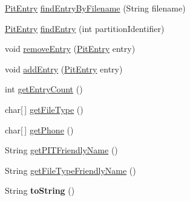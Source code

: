 \begin{DoxyCompactItemize}
\item 
\hyperlink{class_c_a_s_u_a_l_1_1archiving_1_1libpit_1_1_pit_entry}{Pit\-Entry} \hyperlink{class_c_a_s_u_a_l_1_1archiving_1_1libpit_1_1_pit_data_ac07383ca9cf4750eb9de5cdf1690121f}{find\-Entry\-By\-Filename} (String filename)
\item 
\hyperlink{class_c_a_s_u_a_l_1_1archiving_1_1libpit_1_1_pit_entry}{Pit\-Entry} \hyperlink{class_c_a_s_u_a_l_1_1archiving_1_1libpit_1_1_pit_data_a5d139fcadf351b81b00298f1578a9cc5}{find\-Entry} (int partition\-Identifier)
\item 
void \hyperlink{class_c_a_s_u_a_l_1_1archiving_1_1libpit_1_1_pit_data_a2102b1e03aa2de4c6d80f8e43576b06d}{remove\-Entry} (\hyperlink{class_c_a_s_u_a_l_1_1archiving_1_1libpit_1_1_pit_entry}{Pit\-Entry} entry)
\item 
void \hyperlink{class_c_a_s_u_a_l_1_1archiving_1_1libpit_1_1_pit_data_aea22df6b38acde79df88ea8255e60ec2}{add\-Entry} (\hyperlink{class_c_a_s_u_a_l_1_1archiving_1_1libpit_1_1_pit_entry}{Pit\-Entry} entry)
\item 
int \hyperlink{class_c_a_s_u_a_l_1_1archiving_1_1libpit_1_1_pit_data_a64a120bc22b1061952e01188a30f7eeb}{get\-Entry\-Count} ()
\item 
char\mbox{[}$\,$\mbox{]} \hyperlink{class_c_a_s_u_a_l_1_1archiving_1_1libpit_1_1_pit_data_a07f12e00c2077eebc28fc251f87752f8}{get\-File\-Type} ()
\item 
char\mbox{[}$\,$\mbox{]} \hyperlink{class_c_a_s_u_a_l_1_1archiving_1_1libpit_1_1_pit_data_a1cdc24d3cdfdd1e716a856fb3cb2c22d}{get\-Phone} ()
\item 
String \hyperlink{class_c_a_s_u_a_l_1_1archiving_1_1libpit_1_1_pit_data_ab1c581d014e995eab5c36c72ef8c4417}{get\-P\-I\-T\-Friendly\-Name} ()
\item 
String \hyperlink{class_c_a_s_u_a_l_1_1archiving_1_1libpit_1_1_pit_data_a16d06e906b55316b5559420e93ead64d}{get\-File\-Type\-Friendly\-Name} ()
\item 
\hypertarget{class_c_a_s_u_a_l_1_1archiving_1_1libpit_1_1_pit_data_a9f65e9c2ef9988d9dae1fbd30fd0b9fc}{String {\bfseries to\-String} ()}\label{class_c_a_s_u_a_l_1_1archiving_1_1libpit_1_1_pit_data_a9f65e9c2ef9988d9dae1fbd30fd0b9fc}


\end{DoxyCompactItemize}
